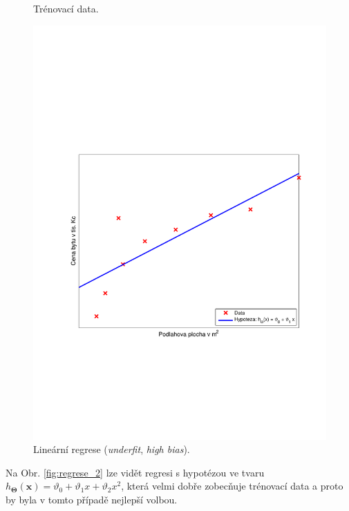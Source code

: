\begin{figure}[!ht]
\begin{minipage}[t]{0.48\textwidth}
  		\caption{Trénovací data.}
		\label{fig:regrese_0}
	\end{minipage}%
	\hfill
	\begin{minipage}[t]{0.48\textwidth}
		\includegraphics[width = \textwidth, trim = 2.5cm 7cm 2cm 9cm]{./Img/Regularizace/Pretrenovani1D/regrese_1.pdf}
  		\caption{Lineární regrese (\textit{underfit}, \textit{high bias}).}	
		\label{fig:regrese_1}
	\end{minipage}%
\end{figure}
\pagebreak

\par{Na Obr. \ref{fig:regrese_2} lze vidět regresi s hypotézou ve tvaru $h_{\bm{\Theta}} \left( \bm{x} \right) = \vartheta_0 + \vartheta_1 x + \vartheta_2 x^2$, která velmi dobře zobecňuje trénovací data a proto by byla v tomto případě nejlepší volbou.}

